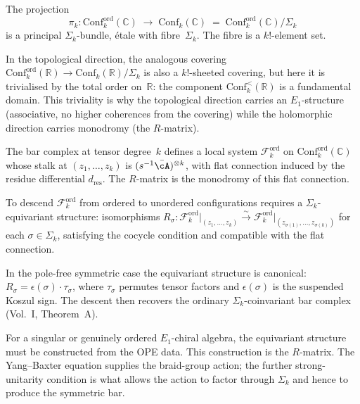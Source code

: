 \begin{construction}
\label{constr:covering-space}
The projection
\[
\pi_k\colon
\mathrm{Conf}_k^{\mathrm{ord}}(\mathbb C)
\;\longrightarrow\;
\mathrm{Conf}_k(\mathbb C)
\;=\;
\mathrm{Conf}_k^{\mathrm{ord}}(\mathbb C)/\Sigma_k
\]
is a principal $\Sigma_k$-bundle, \'etale with fibre~$\Sigma_k$.
The fibre is a $k!$-element set.

In the topological direction, the analogous covering
$\mathrm{Conf}_k^{\mathrm{ord}}(\mathbb R)\to
\mathrm{Conf}_k(\mathbb R)/\Sigma_k$
is also a $k!$-sheeted covering, but here it is trivialised
by the total order on~$\mathbb R$: the component
$\mathrm{Conf}_k^{<}(\mathbb R)$ is a fundamental domain.
This triviality is why the topological direction carries
an $E_1$-structure (associative, no higher coherences from
the covering) while the holomorphic direction carries
monodromy (the $R$-matrix).

The bar complex at tensor degree~$k$ defines a local system
$\mathcal{F}_k^{\mathrm{ord}}$ on
$\mathrm{Conf}_k^{\mathrm{ord}}(\mathbb C)$
whose stalk at $(z_1,\dots,z_k)$ is
$(s^{-1}\bar\cA)^{\otimes k}$, with flat connection induced
by the residue differential $d_{\mathrm{res}}$. The
$R$-matrix is the monodromy of this flat connection.

To descend $\mathcal{F}_k^{\mathrm{ord}}$ from ordered to
unordered configurations requires a $\Sigma_k$-equivariant
structure: isomorphisms
$R_\sigma\colon
\mathcal{F}_k^{\mathrm{ord}}\big|_{(z_1,\dots,z_k)}
\xrightarrow{\sim}
\mathcal{F}_k^{\mathrm{ord}}\big|_{(z_{\sigma(1)},\dots,z_{\sigma(k)})}$
for each $\sigma\in\Sigma_k$, satisfying the cocycle condition
and compatible with the flat connection.

In the pole-free symmetric case the equivariant structure is
canonical: $R_\sigma=\epsilon(\sigma)\cdot\tau_\sigma$, where
$\tau_\sigma$ permutes tensor factors and $\epsilon(\sigma)$ is the
suspended Koszul sign. The descent then recovers the ordinary
$\Sigma_k$-coinvariant bar complex (Vol.~I, Theorem~A).

For a singular or genuinely ordered $E_1$-chiral algebra, the
equivariant structure must be constructed from the OPE data. This
construction is the $R$-matrix. The Yang--Baxter equation supplies the
braid-group action; the further strong-unitarity condition is what
allows the action to factor through $\Sigma_k$ and hence to produce the
symmetric bar.
\end{construction}

